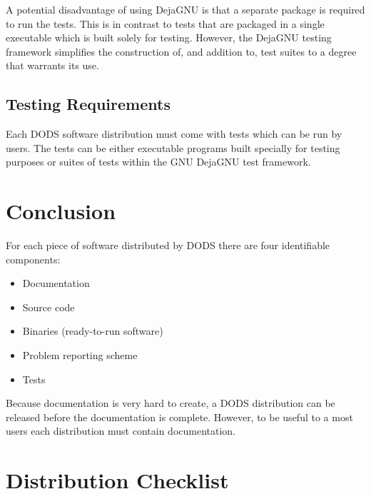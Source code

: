 A potential disadvantage of using DejaGNU is that a separate package is
required to run the tests. This is in contrast to tests that are packaged in
a single executable which is built solely for testing. However, the DejaGNU
testing framework simplifies the construction of, and addition to, test
suites to a degree that warrants its use.

\subsection{Testing Requirements}

Each DODS software distribution must come with tests which can be run by
users. The tests can be either executable programs built specially for testing
purposes or suites of tests within the GNU DejaGNU test framework.

\section{Conclusion}

For each piece of software distributed by DODS there are four identifiable
components:

\begin{itemize}

\item Documentation
\item Source code
\item Binaries (ready-to-run software)
\item Problem reporting scheme
\item Tests

\end{itemize}

Because documentation is very hard to create, a DODS distribution can be
released before the documentation is complete. However, to be useful to a
most users each distribution must contain documentation.

\appendix

\section{Distribution Checklist}

